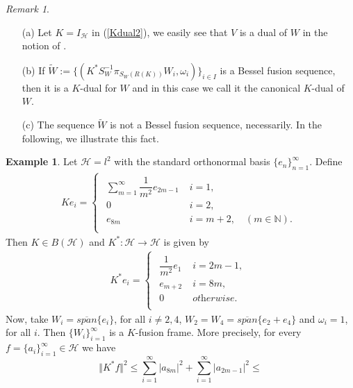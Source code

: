 \documentclass{birkjour}
\theoremstyle{definition}
\newtheorem{ex}[thm]{Example}
\theoremstyle{remark}
\newtheorem{rem}[thm]{Remark}
\numberwithin{equation}{section}
\begin{document}
\begin{rem}
\begin{itemize}
\item[(a)] Let $K = I_{\mathcal{H}}$ in (\ref{Kdual2}), we easily see that $V$ is a dual of $W$ in the notion of \cite{Gav02}.
\item[(b)]If  $\widetilde{W}:=\lbrace
(K^{*}S_{W}^{-1}\pi_{S_{W}(R(K))}W_{i},\omega_{i})\rbrace_{i\in I}$ is a Bessel fusion
sequence, then  it  is a $K$-dual for $W$  and in this case  we call it the canonical $K$-dual of $W$.
\item[(c)]  The sequence $\widetilde{W}$ is not a  Bessel fusion sequence, necessarily. In the following, we  illustrate this fact.
\end{itemize}
\end{rem}
\begin{ex}
Let $\mathcal{H} = l^{2}$  with the  standard orthonormal basis
$\lbrace e_{n}\rbrace_{n=1}^{\infty}$. Define
\begin{eqnarray*}
Ke_{i} =\begin{cases}
\begin{array}{ccc}
\sum_{m=1}^{\infty}\dfrac{1}{m^{2}}e_{2m-1}& \;
{i=1}, \\
0& \; {i=2}, \\
e_{8m}& \; {i=m+2, \quad (m\in \mathbb{N})}. \\
\end{array}
\end{cases}
\end{eqnarray*}
Then $K\in B(\mathcal{H})$ and $K^{*}: \mathcal{H}\rightarrow  \mathcal{H}$ is given by
\begin{eqnarray*}
K^{*}e_{i} =\begin{cases}
\begin{array}{ccc}
\dfrac{1}{m^{2}}e_{1}& \;
{i=2m-1}, \\
e_{m+2}& \; {i=8m}, \\
0& \; {\textit{otherwise}}. \\
\end{array}
\end{cases}
\end{eqnarray*}
Now, take
$W_{i} = \overline{span}\{e_{i}\}$, for all $i\neq 2, 4$,
$W_{2} = W_{4} =  \overline{span}\{e_{2}+e_{4}\}$
and $\omega_{i}=1$, for all $i$.
Then $\lbrace W_{i}\rbrace_{i=1}^{\infty}$ is a $K$-fusion frame. More precisely, for every  $f=\{a_{i}\}_{i=1}^{\infty}\in \mathcal{H}$ we have
\begin{equation*}
\Vert K^{*}f\Vert^{2} \leq \sum_{i=1}^{\infty}\vert a_{8m}\vert^{2}+\sum_{i=1}^{\infty}\vert a_{2m-1}\vert^{2} \leq

\end{equation*}
\end{ex}
\end{document}
